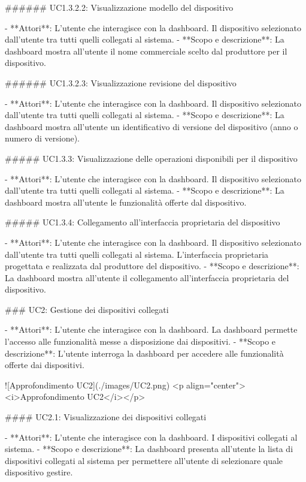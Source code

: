 ###### UC1.3.2.2: Visualizzazione modello del dispositivo

-   **Attori**:  
    L'utente che interagisce con la dashboard. Il dispositivo selezionato dall'utente tra tutti quelli collegati al sistema.
-   **Scopo e descrizione**:  
    La dashboard mostra all'utente il nome commerciale scelto dal produttore per il  dispositivo.

###### UC1.3.2.3: Visualizzazione revisione del dispositivo

-   **Attori**:  
    L'utente che interagisce con la dashboard. Il dispositivo selezionato dall'utente tra tutti quelli collegati al sistema.
-   **Scopo e descrizione**:  
    La dashboard mostra all'utente un identificativo di versione del dispositivo (anno o  numero di versione).

##### UC1.3.3: Visualizzazione delle operazioni disponibili per il dispositivo

-   **Attori**:  
    L'utente che interagisce con la dashboard. Il dispositivo selezionato dall'utente tra tutti quelli collegati al sistema.
-   **Scopo e descrizione**:  
    La dashboard mostra all'utente le funzionalità offerte dal dispositivo.


##### UC1.3.4: Collegamento all'interfaccia proprietaria del dispositivo

-   **Attori**:  
    L'utente che interagisce con la dashboard. Il dispositivo selezionato dall'utente tra tutti quelli collegati al sistema. L'interfaccia proprietaria progettata e realizzata dal produttore del dispositivo.
-   **Scopo e descrizione**:  
    La dashboard mostra all'utente il collegamento all'interfaccia proprietaria del dispositivo.

### UC2: Gestione dei dispositivi collegati

-   **Attori**:  
    L'utente che interagisce con la dashboard. La dashboard permette l'accesso alle funzionalità messe a disposizione dai dispositivi.
-   **Scopo e descrizione**:  
    L'utente interroga la dashboard per accedere alle funzionalità offerte dai dispositivi.

![Approfondimento UC2](./images/UC2.png)
<p align="center"><i>Approfondimento UC2</i></p>

#### UC2.1: Visualizzazione dei dispositivi collegati

-   **Attori**:  
    L'utente che interagisce con la dashboard. I dispositivi collegati al sistema.
-   **Scopo e descrizione**:  
    La dashboard presenta all'utente la lista di dispositivi collegati al sistema per permettere all'utente di selezionare quale dispositivo gestire.


